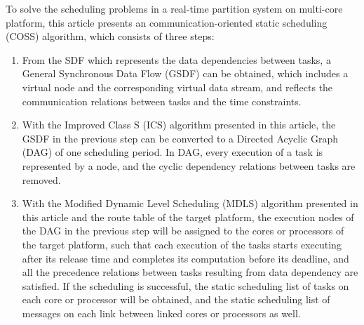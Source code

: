 \begin{eabstract}
To solve the scheduling problems in a real-time partition system on multi-core platform, this article presents an communication-oriented static scheduling (COSS) algorithm, which consists of three steps:
\begin{enumerate}
    \item From the SDF which represents the data dependencies between tasks, a General Synchronous Data Flow (GSDF) can be obtained, which includes a virtual node and the corresponding virtual data stream, and reflects the communication relations between tasks and the time constraints.
    \item With the Improved Class S (ICS) algorithm presented in this article, the GSDF in the previous step can be converted to a Directed Acyclic Graph (DAG) of one scheduling period. In DAG, every execution of a task is represented by a node, and the cyclic dependency relations between tasks are removed.
    \item With the Modified Dynamic Level Scheduling (MDLS) algorithm presented in this article and the route table of the target platform, the execution nodes of the DAG in the previous step will be assigned to the cores or processors of the target platform, such that each execution of the tasks starts executing after its release time and completes its computation before its deadline, and all the precedence relations between tasks resulting from data dependency are satisfied. If the scheduling is successful, the static scheduling list of tasks on each core or processor will be obtained, and the static scheduling list of messages on each link between linked cores or processors as well.
\end{enumerate}



\end{eabstract}
